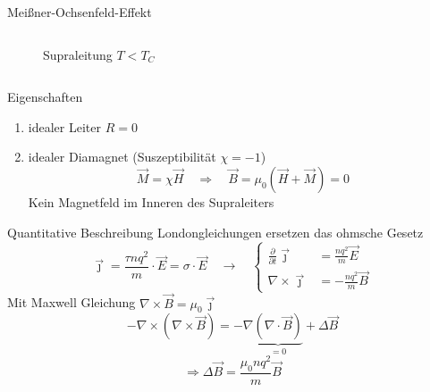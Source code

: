 \begin{frame}{Meißner-Ochsenfeld-Effekt}
\begin{columns}
\begin{column}{0.49\textwidth}
\begin{figure}
    \caption{Supraleitung $T < T_{C}$}
    \label{fig: bfeld_supraleitung}
  \end{figure}
\end{column}
\end{columns}
\end{frame}

\begin{frame}{Eigenschaften}
  \begin{enumerate}
    \item idealer Leiter $R = 0$
    \item idealer Diamagnet (Suszeptibilität $\chi = -1$)
    \begin{equation}
      \vec{M} = \chi \vec{H} \quad \Rightarrow \quad \vec{B} = \mu_0 (\vec{H} + \vec{M}) = 0
    \end{equation}
    Kein Magnetfeld im Inneren des Supraleiters
  \end{enumerate}

\end{frame}
\begin{frame}{Quantitative Beschreibung}
Londongleichungen ersetzen das ohmsche Gesetz
\begin{equation}
  \vec{\jmath} = \frac{\tau n q^2}{m}\cdot \vec{E} = \sigma\cdot \vec{E}\quad  \longrightarrow \quad
  \begin{cases}
    \frac{\partial }{\partial t}\vec{\jmath} &= \frac{nq^2}{m}\vec{E} \\
    \nabla \times \vec{\jmath} &= - \frac{n q^2}{m} \vec{B}
  \end{cases}
\end{equation}
\pause
Mit Maxwell Gleichung $\nabla \times \vec{B} = \mu_0 \vec{\jmath}$
\begin{equation}
-\nabla \times (\nabla \times \vec{B}) = -\nabla\underbrace{(\nabla \cdot \vec{B})}_{= 0} + \Delta \vec{B}
\end{equation}
\begin{equation*}
\Rightarrow  \Delta \vec{B} = \frac{\mu_0 n q^2}{m}\vec{B}
\end{equation*}
\end{frame}


